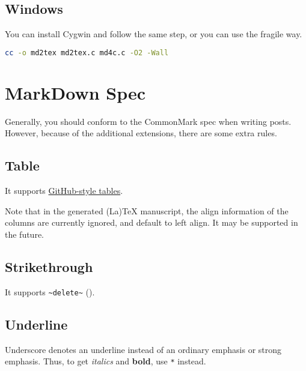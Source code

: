 \subsection{Windows}
You can install Cygwin and follow the same step, or you can use the fragile way.\par
\begin{lstlisting}[language=sh]
cc -o md2tex md2tex.c md4c.c -O2 -Wall
\end{lstlisting}
\section{MarkDown Spec}
Generally, you should conform to the CommonMark spec when writing posts. However, because of the additional extensions, there are some extra rules.\par
\subsection{Table}
It supports \href{https://github.com/github/docs/blob/main/content/get-started/writing-on-github/working-with-advanced-formatting/organizing-information-with-tables.md}{GitHub-style tables}.\par
Note that in the generated (La)TeX manuscript, the align information of the columns are currently ignored, and default to left align. It may be supported in the future.\par
\subsection{Strikethrough}
It supports \verb!~delete~! ().\par
\subsection{Underline}
Underscore denotes an underline instead of an ordinary emphasis or strong emphasis. Thus, to get \textit{italics} and \textbf{bold}, use \verb!*! instead.\par
